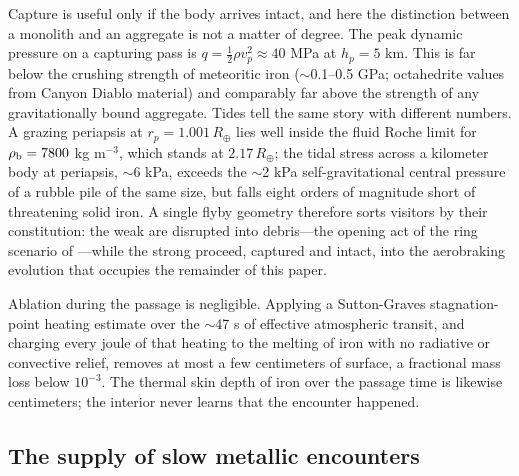\documentclass[twocolumn]{aastex701}
\newcommand{\RE}{R_{\oplus}}
\begin{document}
Capture is useful only if the body arrives intact, and here the distinction
between a monolith and an aggregate is not a matter of degree. The peak
dynamic pressure on a capturing pass is $q = \tfrac{1}{2}\rho v_{p}^{2}
\approx 40$ MPa at $h_{p} = 5$ km. This is far below the crushing strength
of meteoritic iron ($\sim$0.1--0.5 GPa; octahedrite values from Canyon
Diablo material) and comparably far above the strength of any
gravitationally bound aggregate. Tides tell the same story with different
numbers. A grazing periapsis at $r_{p} = 1.001\,\RE$ lies well inside the
fluid Roche limit for $\rho_{\rm b} = 7800$ kg m$^{-3}$, which stands at
$2.17\,\RE$; the tidal stress across a kilometer body at periapsis,
$\sim$6 kPa, exceeds the $\sim$2 kPa self-gravitational central pressure of
a rubble pile of the same size, but falls eight orders of magnitude short
of threatening solid iron. A single flyby geometry therefore sorts
visitors by their constitution: the weak are disrupted into debris---the
opening act of the ring scenario of \citet{tomkins2024}---while the strong
proceed, captured and intact, into the aerobraking evolution that occupies
the remainder of this paper.

Ablation during the passage is negligible. Applying a Sutton-Graves
stagnation-point heating estimate over the $\sim$47 s of effective
atmospheric transit, and charging every joule of that heating to the
melting of iron with no radiative or convective relief, removes at most a
few centimeters of surface, a fractional mass loss below $10^{-3}$. The
thermal skin depth of iron over the passage time is likewise centimeters;
the interior never learns that the encounter happened.

\subsection{The supply of slow metallic encounters} \label{sec:supply}
\end{document}
